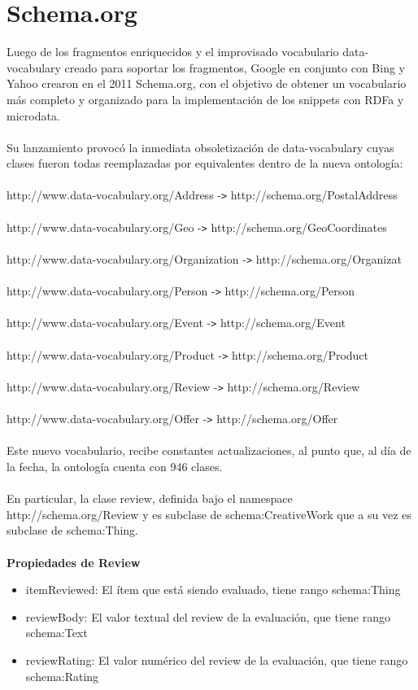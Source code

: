 \section{Schema.org}
\label{section:schema}

Luego de los fragmentos enriquecidos y el improvisado vocabulario data-vocabulary creado para soportar los fragmentos, Google 
en conjunto con Bing y Yahoo crearon en el 2011 Schema.org, con el objetivo de obtener un vocabulario más completo y 
organizado para la implementación de los snippets con RDFa y microdata.
\\\\
Su lanzamiento provocó la inmediata obsoletización de data-vocabulary cuyas clases fueron todas reemplazadas por equivalentes 
dentro de la nueva ontología:\\\\
http://www.data-vocabulary.org/Address -\verb|>| http://schema.org/PostalAddress
\\\\ http://www.data-vocabulary.org/Geo -\verb|>| http://schema.org/GeoCoordinates
\\\\ http://www.data-vocabulary.org/Organization -\verb|>| http://schema.org/Organizat
\\\\ http://www.data-vocabulary.org/Person -\verb|>| http://schema.org/Person
\\\\ http://www.data-vocabulary.org/Event -\verb|>| http://schema.org/Event
\\\\ http://www.data-vocabulary.org/Product -\verb|>| http://schema.org/Product
\\\\ http://www.data-vocabulary.org/Review -\verb|>| http://schema.org/Review
\\\\ http://www.data-vocabulary.org/Offer -\verb|>| http://schema.org/Offer
\\\\
Este nuevo vocabulario, recibe constantes actualizaciones, al punto que, al día de la fecha, la ontología cuenta con 946 clases. 
\\\\
En particular, la clase review, definida bajo el namespace \\\noindent http://schema.org/Review y es subclase de schema:CreativeWork 
que a su vez es subclase de schema:Thing.\\\\
\textbf{Propiedades de Review}
 \begin{itemize}
  \item itemReviewed: El ítem que está siendo evaluado, tiene rango schema:Thing 
  \item reviewBody: El valor textual del review de la evaluación, que tiene rango schema:Text 
  \item reviewRating: El valor numérico del review de la evaluación, que tiene rango schema:Rating 
 \end{itemize}

